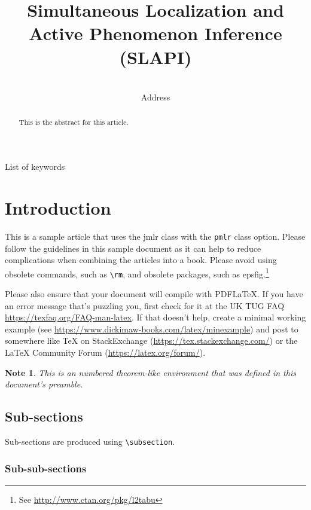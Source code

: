 \documentclass[pmlr]{jmlr}%
\title[SLAPI]{Simultaneous Localization and Active Phenomenon Inference (SLAPI)}
\author{\Name{Author Name1\nametag{\thanks{with a note}}} \Email{abc@sample.com}\and
   \Name{Author Name2} \Email{xyz@sample.com}\\
   \addr Address}
\newtheorem*{note}{Note}
\begin{document}
\maketitle

\begin{abstract}
This is the abstract for this article.
\end{abstract}
\begin{keywords}
List of keywords
\end{keywords}

\section{Introduction}
\label{sec:intro}

This is a sample article that uses the \textsf{jmlr} class with
the \texttt{pmlr} class option.  Please follow the guidelines in
this sample document as it can help to reduce complications when
combining the articles into a book. Please avoid using obsolete
commands, such as \verb|\rm|, and obsolete packages, such as
\textsf{epsfig}.\footnote{See
\url{http://www.ctan.org/pkg/l2tabu}}

Please also ensure that your document will compile with PDF\LaTeX.
If you have an error message that's puzzling you, first check for it
at the UK TUG FAQ
\url{https://texfaq.org/FAQ-man-latex}.  If
that doesn't help, create a minimal working example (see
\url{https://www.dickimaw-books.com/latex/minexample}) and post
to somewhere like TeX on StackExchange
(\url{https://tex.stackexchange.com/}) or the LaTeX Community Forum
(\url{https://latex.org/forum/}).

\begin{note}
This is an numbered theorem-like environment that was defined in
this document's preamble.
\end{note}

\subsection{Sub-sections}

Sub-sections are produced using \verb|\subsection|.

\subsubsection{Sub-sub-sections}
\end{document}
